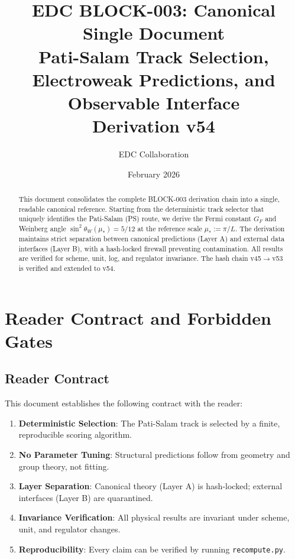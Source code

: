 \documentclass[11pt,a4paper]{article}
\title{\textbf{EDC BLOCK-003: Canonical Single Document}\\[0.5em]
\large Pati-Salam Track Selection, Electroweak Predictions, and Observable Interface\\[0.3em]
\normalsize Derivation v54}
\author{EDC Collaboration}
\date{February 2026}
\begin{document}
\maketitle

\begin{abstract}
This document consolidates the complete BLOCK-003 derivation chain into a single, readable canonical reference. Starting from the deterministic track selector that uniquely identifies the Pati-Salam (PS) route, we derive the Fermi constant $G_F$ and Weinberg angle $\sin^2\theta_W(\mu_*)=5/12$ at the reference scale $\mu_*:=\pi/L$. The derivation maintains strict separation between canonical predictions (Layer A) and external data interfaces (Layer B), with a hash-locked firewall preventing contamination. All results are verified for scheme, unit, log, and regulator invariance. The hash chain v45$\to$v53 is verified and extended to v54.
\end{abstract}

\tableofcontents
\newpage

\section{Reader Contract and Forbidden Gates}
\label{sec:reader-contract}

\subsection{Reader Contract}
\label{subsec:reader-contract}

This document establishes the following contract with the reader:

\begin{canonbox}
\label{box:reader-contract}
\begin{enumerate}[label=\textbf{RC-\arabic*}]
    \item \label{rc:deterministic} \textbf{Deterministic Selection}: The Pati-Salam track is selected by a finite, reproducible scoring algorithm.
    \item \label{rc:no-tuning} \textbf{No Parameter Tuning}: Structural predictions follow from geometry and group theory, not fitting.
    \item \label{rc:separation} \textbf{Layer Separation}: Canonical theory (Layer A) is hash-locked; external interfaces (Layer B) are quarantined.
    \item \label{rc:invariance} \textbf{Invariance Verification}: All physical results are invariant under scheme, unit, and regulator changes.
    \item \label{rc:reproducibility} \textbf{Reproducibility}: Every claim can be verified by running \texttt{recompute.py}.
\end{enumerate}
\end{canonbox}
\end{document}
